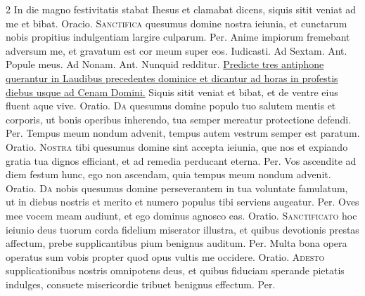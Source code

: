 \begin{multicols*}{2}
 In die magno festivitatis stabat Ihesus et clamabat dicens, siquis sitit veniat ad me et bibat. {\color{Red} Oracio.}
\lettrine[lines=2]{\zallmancaps \color{Red} S}{anctifica} quesumus domine nostra ieiunia, et cunctarum nobis propitius indulgentiam largire culparum. Per.
 Anime impiorum fremebant adversum me, et gravatum est cor meum super eos.
 Iudicasti. {\color{Red} Ad Sextam. Ant.} Popule meus. {\color{Red} Ad Nonam. Ant.} Nunquid redditur.
\newline \ul{Predicte tres antiphone querantur in Laudibus precedentes dominice et dicantur ad horas in profestis diebus usque ad Cenam Domini.}
 Siquis sitit veniat et bibat, et de ventre eius fluent aque vive. {\color{Red} Oratio.}
\lettrine[lines=2]{\zallmancaps \color{Blue} D}{a} quesumus domine populo tuo salutem mentis et corporis, ut bonis operibus inherendo, tua semper mereatur protectione defendi. Per.
 Tempus meum nondum advenit, tempus autem vestrum semper est paratum. {\color{Red} Oratio.}
\lettrine[lines=2]{\zallmancaps \color{Red} N}{ostra} tibi quesumus domine sint accepta ieiunia, que nos et expiando gratia tua dignos efficiant, et ad remedia perducant eterna. Per.
 Vos ascendite ad diem festum hunc, ego non ascendam, quia tempus meum nondum advenit. {\color{Red} Oratio.}
\lettrine[lines=2]{\zallmancaps \color{Blue} D}{a} nobis quesumus domine perseverantem in tua voluntate famulatum, ut in diebus nostris et merito et numero populus tibi serviens augeatur. Per.
 Oves mee vocem meam audiunt, et ego dominus agnosco eas. {\color{Red} Oratio.}
\lettrine[lines=2]{\zallmancaps \color{Red} S}{anctificato} hoc ieiunio deus tuorum corda fidelium miserator illustra, et quibus devotionis prestas affectum, prebe supplicantibus pium benignus auditum. Per.
 Multa bona opera operatus sum vobis propter quod opus vultis me occidere. {\color{Red} Oratio.}
\lettrine[lines=2]{\zallmancaps \color{Blue} A}{desto} supplicationibus nostris omnipotens deus, et quibus fiduciam sperande pietatis indulges, consuete misericordie tribuet benignus effectum. Per.

\end{multicols*}
